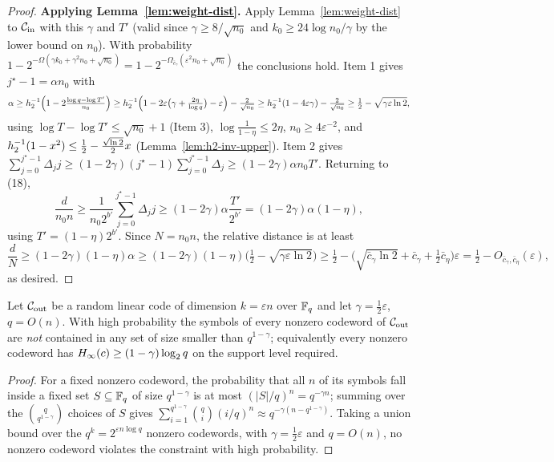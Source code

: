 \begin{proof}
  \textbf{Applying Lemma~\ref{lem:weight-dist}.} Apply Lemma~\ref{lem:weight-dist}
  to $\mathcal{C}_{\mathrm{in}}$ with this $\gamma$ and $T'$ (valid since $\gamma \geq 8/\sqrt{n_0}$ and
  $k_0 \geq 24\log n_0/\gamma$ by the lower bound on $n_0$). With probability
  $1 - 2^{-\Omega(\gamma k_0 + \gamma^2 n_0 + \sqrt{n_0})} = 1 -
  2^{-\Omega_{\bar c_\gamma}(\varepsilon^2 n_0 + \sqrt{n_0})}$ the conclusions
  hold. Item 1 gives $j^\star - 1 = \alpha n_0$ with
  \[
    \alpha \geq h_2^{-1}\Big(1 - 2\tfrac{\log q - \log T'}{n_0}\Big)
      \geq h_2^{-1}\Big(1 - 2\varepsilon\big(\gamma + \tfrac{2\eta}{\log q}\big)
        - \varepsilon\Big) - \tfrac{2}{\sqrt{n_0}}
      \geq h_2^{-1}(1 - 4\varepsilon\gamma) - \tfrac{2}{\sqrt{n_0}}
      \geq \tfrac12 - \sqrt{\gamma\varepsilon\ln 2},
  \]
  using $\log T - \log T'\leq \sqrt{n_0} + 1$ (Item 3), $\log\frac{1}{1-\eta}\leq
  2\eta$, $n_0 \geq 4\varepsilon^{-2}$, and $h_2^{-1}(1 - x^2)\leq \frac12 -
  \frac{\sqrt{\ln 2}}{2}x$ (Lemma~\ref{lem:h2-inv-upper}). Item 2 gives
  $\sum_{j=0}^{j^\star-1}\Delta_j j\geq (1-2\gamma)(j^\star-1)\sum_{j=0}^{j^\star-1}
  \Delta_j\geq (1-2\gamma)\alpha n_0 T'$. Returning to (18),
  \[
    \frac{d}{n_0 n}\geq \frac{1}{n_0 2^{b'}}\sum_{j=0}^{j^\star-1}\Delta_j j
      \geq (1-2\gamma)\alpha\frac{T'}{2^{b'}} = (1-2\gamma)\alpha(1-\eta),
  \]
  using $T' = (1-\eta)2^{b'}$. Since $N = n_0 n$, the relative distance is at
  least
  \[
    \frac{d}{N}\geq (1-2\gamma)(1-\eta)\alpha
      \geq (1-2\gamma)(1-\eta)\Big(\tfrac12 - \sqrt{\gamma\varepsilon\ln 2}\Big)
      \geq \tfrac12 - \big(\sqrt{\bar c_\gamma\ln 2} + \bar c_\gamma
        + \tfrac12\bar c_\eta\big)\varepsilon
      = \tfrac12 - O_{\bar c_\gamma,\bar c_\eta}(\varepsilon),
  \]
  as desired.
\end{proof}

\begin{proposition}
  \label{prop:rlc-smooth}
  Let $\mathcal{C}_{\mathrm{out}}$ be a random linear code of dimension $k = \varepsilon n$ over
  $\mathbb{F}_q$ and let $\gamma = \frac12\varepsilon$, $q = O(n)$. With high probability
  the symbols of every nonzero codeword of $\mathcal{C}_{\mathrm{out}}$ are \emph{not} contained in any
  set of size smaller than $q^{1-\gamma}$; equivalently every nonzero codeword has
  $H_\infty(c)\geq (1-\gamma)\log_2 q$ on the support level required.
\end{proposition}
\begin{proof}
  For a fixed nonzero codeword, the probability that all $n$ of its symbols fall
  inside a fixed set $S \subseteq \mathbb{F}_q$ of size $q^{1-\gamma}$ is at most
  $(|S|/q)^n = q^{-\gamma n}$; summing over the $\binom{q}{q^{1-\gamma}}$ choices
  of $S$ gives
  $\sum_{i=1}^{q^{1-\gamma}}\binom{q}{i}(i/q)^n\approx q^{-\gamma(n - q^{1-\gamma})}$.
  Taking a union bound over the $q^k = 2^{\varepsilon n\log q}$ nonzero codewords,
  with $\gamma = \frac12\varepsilon$ and $q = O(n)$, no nonzero codeword violates
  the constraint with high probability.
\end{proof}
